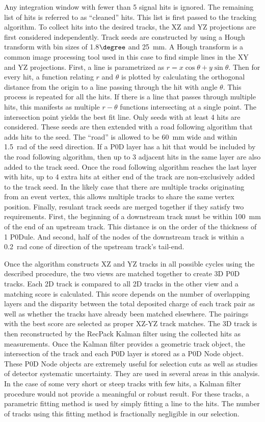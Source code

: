 Any integration window with fewer than 5 signal hits is ignored. The remaining list of hits is referred to as ``cleaned'' hits. This list is first passed to the tracking algorithm. To collect hits into the desired tracks, the XZ and YZ projections are first considered independently. Track seeds are constructed by using a Hough transform with bin sizes of 1.8$\degree$ and 25~mm. A Hough transform is a common image processing tool used in this case to find simple lines in the XY and YZ projections. First, a line is parametrized as $r = x \cos\theta + y \sin\theta$. Then for every hit, a function relating $r$ and $\theta$ is plotted by calculating the orthogonal distance from the origin to a line passing through the hit with angle $\theta$. This process is repeated for all the hits. If there is a line that passes through multiple hits, this manifests as multiple $r-\theta$ functions intersecting at a single point. The intersection point yields the best fit line. Only seeds with at least 4 hits are considered. These seeds are then extended with a road following algorithm that adds hits to the seed. The ``road'' is allowed to be 60~mm wide and within 1.5~rad of the seed direction. If a P0D layer has a hit that would be included by the road following algorithm, then up to 3 adjacent hits in the same layer are also added to the track seed. Once the road following algorithm reaches the last layer with hits, up to 4 extra hits at either end of the track are non-exclusively added to the track seed. In the likely case that there are multiple tracks originating from an event vertex, this allows multiple tracks to share the same vertex position. Finally, resulant track seeds are merged together if they satisfy two requirements. First, the beginning of a downstream track must be within 100~mm of the end of an upstream track. This distance is on the order of the thickness of 1 P0Dule. And second, half of the nodes of the downstream track is within a 0.2~rad cone of direction of the upstream track's tail-end. 

Once the algorithm constructs XZ and YZ tracks in all possible cycles using the described procedure, the two views are matched together to create 3D P0D tracks. Each 2D track is compared to all 2D tracks in the other view and a matching score is calculated. This score depends on the number of overlapping layers and the disparity between the total deposited charge of each track pair as well as whether the tracks have already been matched elsewhere. The pairings with the best score are selected as proper XZ-YZ track matches. The 3D track is then reconstructed by the RecPack Kalman filter using the collected hits as measurements. Once the Kalman filter provides a geometric track object, the intersection of the track and each P0D layer is stored as a P0D Node object. These P0D Node objects are extremely useful for selection cuts as well as studies of detector systematic uncertainty. They are used in several areas in this analysis. In the case of some very short or steep tracks with few hits, a Kalman filter procedure would not provide a meaningful or robust result. For these tracks, a parametric fitting method is used by simply fitting a line to the hits. The number of tracks using this fitting method is fractionally negligible in our selection.


